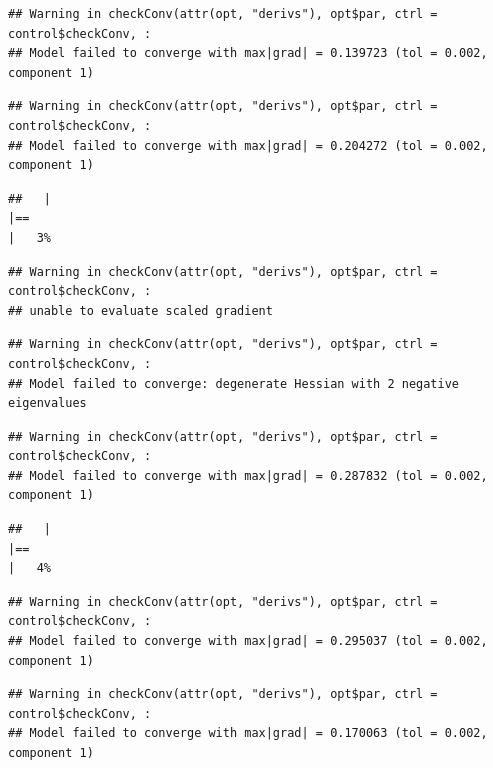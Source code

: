 \documentclass[
  12pt,
]{book}
\begin{document}
\begin{verbatim}
## Warning in checkConv(attr(opt, "derivs"), opt$par, ctrl = control$checkConv, :
## Model failed to converge with max|grad| = 0.139723 (tol = 0.002, component 1)
\end{verbatim}

\begin{verbatim}
## Warning in checkConv(attr(opt, "derivs"), opt$par, ctrl = control$checkConv, :
## Model failed to converge with max|grad| = 0.204272 (tol = 0.002, component 1)
\end{verbatim}

\begin{verbatim}
##   |                                                                              |==                                                                    |   3%
\end{verbatim}

\begin{verbatim}
## Warning in checkConv(attr(opt, "derivs"), opt$par, ctrl = control$checkConv, :
## unable to evaluate scaled gradient
\end{verbatim}

\begin{verbatim}
## Warning in checkConv(attr(opt, "derivs"), opt$par, ctrl = control$checkConv, :
## Model failed to converge: degenerate Hessian with 2 negative eigenvalues
\end{verbatim}

\begin{verbatim}
## Warning in checkConv(attr(opt, "derivs"), opt$par, ctrl = control$checkConv, :
## Model failed to converge with max|grad| = 0.287832 (tol = 0.002, component 1)
\end{verbatim}

\begin{verbatim}
##   |                                                                              |==                                                                    |   4%
\end{verbatim}

\begin{verbatim}
## Warning in checkConv(attr(opt, "derivs"), opt$par, ctrl = control$checkConv, :
## Model failed to converge with max|grad| = 0.295037 (tol = 0.002, component 1)
\end{verbatim}

\begin{verbatim}
## Warning in checkConv(attr(opt, "derivs"), opt$par, ctrl = control$checkConv, :
## Model failed to converge with max|grad| = 0.170063 (tol = 0.002, component 1)
\end{verbatim}
\end{document}
